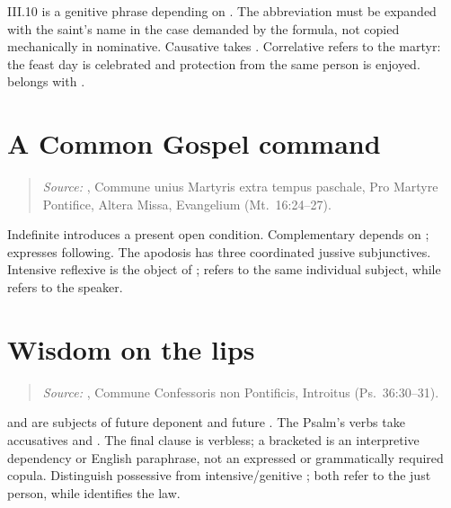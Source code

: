 \begin{courseunit}{III.10}
 is a genitive phrase depending on
. The abbreviation  must be expanded with the
saint's name in the case demanded by the formula, not copied mechanically in
nominative. Causative  takes . Correlative
 refers to the martyr: the feast day is celebrated and
protection from the same person is enjoyed.  belongs
with .

\section{A Common Gospel command}

\begin{quote}

\emph{Source:} \Missal, Commune unius Martyris extra tempus paschale, Pro
Martyre Pontifice, Altera Missa, Evangelium (Mt.~16:24--27).
\end{quote}

Indefinite  introduces a present open condition. Complementary
 depends on ;  expresses following.
The apodosis has three coordinated jussive subjunctives. Intensive reflexive
 is the object of ;  refers to the
same individual subject, while  refers to the speaker.

\section{Wisdom on the lips}

\begin{quote}

\emph{Source:} \Missal, Commune Confessoris non Pontificis, Introitus
(Ps.~36:30--31).
\end{quote}

 and  are subjects of future deponent
 and future . The Psalm's verbs take
accusatives  and . The final clause is
verbless; a bracketed \Latin{[est]} is an interpretive dependency or English
paraphrase, not an expressed or grammatically required copula. Distinguish possessive
 from intensive/genitive ; both refer to the just
person, while  identifies the law.


\end{courseunit}
